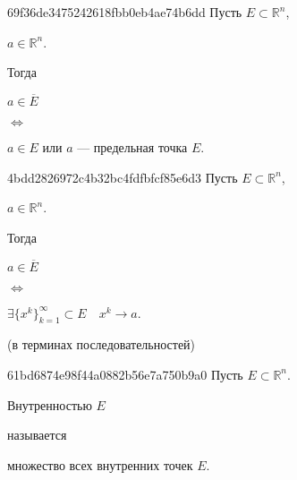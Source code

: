 \begin{note}{69f36de3475242618fbb0eb4ae74b6dd}
    Пусть \({ E \subset \mathbb R^{n} }\),\: \begin{icloze}{4}\({ a \in \mathbb R^{n} }\).\end{icloze}
    Тогда
    \begin{center}
        \begin{icloze}{2}\({ a \in \overline{E} }\) \end{icloze}
        \begin{icloze}{3}\({ \iff }\)\end{icloze}
        \begin{icloze}{1}\({ a \in E }\) или \({ a }\) --- предельная точка \({ E }\).\end{icloze}
    \end{center}
\end{note}

\begin{note}{4bdd2826972c4b32bc4fdfbfcf85e6d3}
    Пусть \({ E \subset \mathbb R^{n} }\),\: \begin{icloze}{4}\({ a \in \mathbb R^{n} }\).\end{icloze}
    Тогда
    \begin{center}
        \begin{icloze}{2}\({ a \in \overline{E} }\) \end{icloze}
        \begin{icloze}{3}\({ \iff }\)\end{icloze}
        \begin{icloze}{1}\({ \exists \{ x^{k} \}_{k = 1}^{\infty} \subset E \quad x^{k} \to a }\).\end{icloze}
    \end{center}

    \begin{center}
        \tiny (в терминах последовательностей)
    \end{center}
\end{note}

\begin{note}{61bd6874e98f44a0882b56e7a750b9a0}
    Пусть \({ E \subset \mathbb R^{n} }\).
    \begin{icloze}{2}Внутренностью \({ E }\)\end{icloze} называется \begin{icloze}{1}множество всех внутренних точек \({ E }\).\end{icloze}
\end{note}

